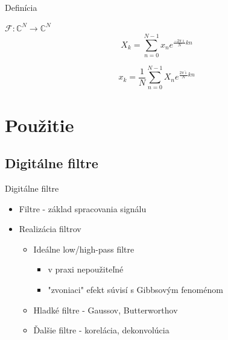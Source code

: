 \documentclass{beamer}
\def\imag{\hat{\imath}}
\def\sipka{\rightarrow}
\def\C{\mathbb{C}}
\begin{document}
\begin{frame}{Definícia}
    \begin{definition}
    $\mathcal{F}:\C^N\sipka\C^N$
        \begin{equation*}
            X_k = \sum_{n=0}^{N-1} x_n e^{\frac{-2\pi\imag}{N} k n}
        \end{equation*}
    \end{definition}
    \begin{definition}
        \begin{equation*}
            x_k = \frac{1}{N} \sum_{n=0}^{N-1} X_n e^{\frac{2\pi\imag}{N} kn}
        \end{equation*}
    \end{definition}
\end{frame}

\section{Použitie}
\subsection{Digitálne filtre}
\begin{frame}{Digitálne filtre}
    \begin{itemize}
        \item Filtre - základ spracovania signálu
        \item Realizácia filtrov
            \begin{itemize}
                \item Ideálne low/high-pass filtre
                    \begin{itemize}
                    \item v praxi nepoužiteľné
                    \item "zvoniaci" efekt súvisí s Gibbsovým fenoménom
                    \end{itemize}
                \item Hladké filtre - Gaussov, Butterworthov
                \item Ďalšie filtre - korelácia, dekonvolúcia
            \end{itemize}
    \end{itemize}
\end{frame}

\end{document}
